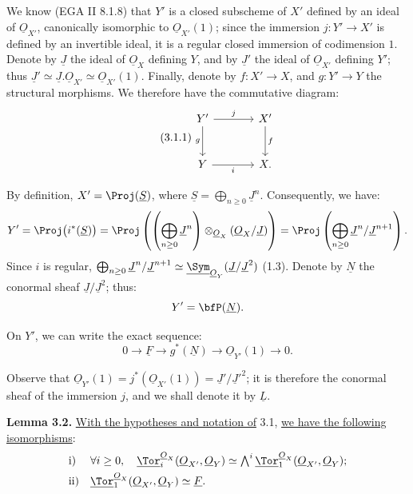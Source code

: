 %
We know (EGA II 8.1.8) that \(Y'\) is a closed subscheme of \(X'\) defined by an ideal of \(\underline{O}_{X'}\), canonically isomorphic to \(\underline{O}_{X'}(1)\); since the immersion \(j:Y'\to X'\) is defined by an invertible ideal, it is a regular closed immersion of codimension \(1\). Denote by \(\underline{J}\) the ideal of \(\underline{O}_X\) defining \(Y\), and by \(\underline{J}'\) the ideal of \(\underline{O}_{X'}\) defining \(Y'\); thus \(\underline{J}'\simeq \underline{J}.\underline{O}_{X'}\simeq\underline{O}_{X'}(1)\). Finally, denote by \(f:X'\to X\), and \(g:Y'\to Y\) the structural morphisms. We therefore have the commutative diagram:
\begin{equation}\tag{3.1.1}
\begin{tikzcd}[column sep=large,row sep=large]
Y' \arrow[r,"j"] \arrow[d,"g"'] & X' \arrow[d,"f"]\\
Y \arrow[r,"i"'] & X.
\end{tikzcd}
\end{equation}

By definition, \(X'=\Proj(\underline{S})\), where \(\underline{S}=\bigoplus_{n\ge0}\underline{J}^n\). Consequently, we have:
\[
Y'=\Proj\bigl(i^*(\underline{S})\bigr)
=\Proj\left(\left(\bigoplus_{n\ge0}\underline{J}^n\right)\otimes_{\underline{O}_X}(\underline{O}_X/\underline{J})\right)
=\Proj\left(\bigoplus_{n\ge0}\underline{J}^n/\underline{J}^{n+1}\right).
\]
Since \(i\) is regular, \(\bigoplus_{n\ge0}\underline{J}^n/\underline{J}^{n+1}\simeq \underline{\Sym}_{\underline{O}_Y}(\underline{J}/\underline{J}^2)\) (1.3). Denote by \(\underline{N}\) the conormal sheaf \(\underline{J}/\underline{J}^2\); thus:
\[
Y'=\bfP(\underline{N}).
\]

On \(Y'\), we can write the exact sequence:
\begin{equation}\tag{3.1.2}
0\to \underline{F}\to g^*(\underline{N})\to\underline{O}_{Y'}(1)\to0.
\end{equation}

Observe that \(\underline{O}_{Y'}(1)=j^*(\underline{O}_{X'}(1))=\underline{J}'/\underline{J}'^2\); it is therefore the conormal sheaf of the immersion \(j\), and we shall denote it by \(\underline{L}\).

\textbf{Lemma 3.2.} \uline{With the hypotheses and notation of} 3.1, \uline{we have the following isomorphisms}:
\[
\begin{array}{ll}
\text{i)}&
\forall i\ge0,\quad
\underline{\Tor}_i^{\underline{O}_X}(\underline{O}_{X'},\underline{O}_Y)
\simeq
\bigwedge^i\underline{\Tor}_1^{\underline{O}_X}(\underline{O}_{X'},\underline{O}_Y);\\[4pt]
\text{ii)}&
\underline{\Tor}_1^{\underline{O}_X}(\underline{O}_{X'},\underline{O}_Y)\simeq \underline{F}.
\end{array}
\]

